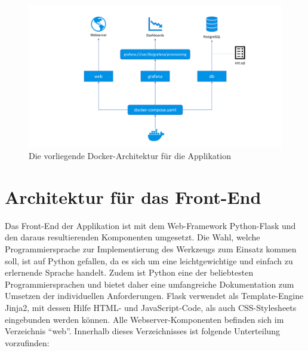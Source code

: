 \begin{figure}[t]
    \centering
    \includegraphics[width=\widefigurewidth]{appendices/Architektur_Docker.pdf}
    \caption[Docker-Architektur]{Die vorliegende Docker-Architektur für die Applikation}
    \label{fig:dockerarchitecture}
\end{figure}

\section{Architektur für das Front-End}
Das Front-End der Applikation ist mit dem Web-Framework Python-Flask und den daraus resultierenden Komponenten umgesetzt. Die Wahl, welche Programmiersprache zur Implementierung des Werkzeugs zum Einsatz kommen soll, ist auf Python gefallen, da es sich um eine leichtgewichtige und einfach zu erlernende Sprache handelt. Zudem ist Python eine der beliebtesten Programmiersprachen und bietet daher eine umfangreiche Dokumentation zum Umsetzen der individuellen Anforderungen. Flask verwendet als Template-Engine Jinja2, mit dessen Hilfe HTML- und JavaScript-Code, als auch CSS-Stylesheets eingebunden werden können. Alle Webserver-Komponenten befinden sich im Verzeichnis \enquote{web}. Innerhalb dieses Verzeichnisses ist folgende Unterteilung vorzufinden:

